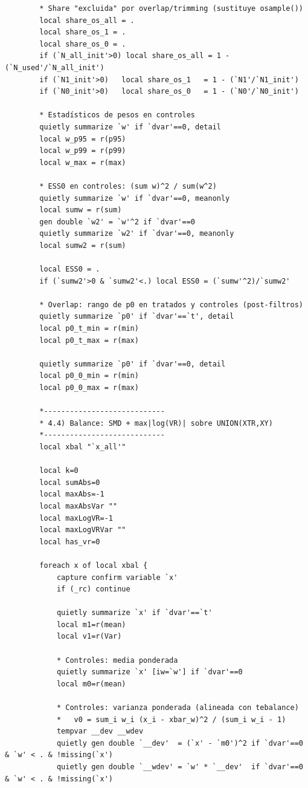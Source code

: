 \documentclass[12pt]{article}
\begin{document}
\begin{lstlisting}
        * Share "excluida" por overlap/trimming (sustituye osample())
        local share_os_all = .
        local share_os_1 = .
        local share_os_0 = .
        if (`N_all_init'>0) local share_os_all = 1 - (`N_used'/`N_all_init')
        if (`N1_init'>0)   local share_os_1   = 1 - (`N1'/`N1_init')
        if (`N0_init'>0)   local share_os_0   = 1 - (`N0'/`N0_init')

        * Estadísticos de pesos en controles
        quietly summarize `w' if `dvar'==0, detail
        local w_p95 = r(p95)
        local w_p99 = r(p99)
        local w_max = r(max)

        * ESS0 en controles: (sum w)^2 / sum(w^2)
        quietly summarize `w' if `dvar'==0, meanonly
        local sumw = r(sum)
        gen double `w2' = `w'^2 if `dvar'==0
        quietly summarize `w2' if `dvar'==0, meanonly
        local sumw2 = r(sum)

        local ESS0 = .
        if (`sumw2'>0 & `sumw2'<.) local ESS0 = (`sumw'^2)/`sumw2'

        * Overlap: rango de p0 en tratados y controles (post-filtros)
        quietly summarize `p0' if `dvar'==`t', detail
        local p0_t_min = r(min)
        local p0_t_max = r(max)

        quietly summarize `p0' if `dvar'==0, detail
        local p0_0_min = r(min)
        local p0_0_max = r(max)

        *----------------------------
        * 4.4) Balance: SMD + max|log(VR)| sobre UNION(XTR,XY)
        *----------------------------
        local xbal "`x_all'"

        local k=0
        local sumAbs=0
        local maxAbs=-1
        local maxAbsVar ""
        local maxLogVR=-1
        local maxLogVRVar ""
        local has_vr=0

        foreach x of local xbal {
            capture confirm variable `x'
            if (_rc) continue

            quietly summarize `x' if `dvar'==`t'
            local m1=r(mean)
            local v1=r(Var)

            * Controles: media ponderada
            quietly summarize `x' [iw=`w'] if `dvar'==0
            local m0=r(mean)

            * Controles: varianza ponderada (alineada con tebalance)
            *   v0 = sum_i w_i (x_i - xbar_w)^2 / (sum_i w_i - 1)
            tempvar __dev __wdev
            quietly gen double `__dev'  = (`x' - `m0')^2 if `dvar'==0 & `w' < . & !missing(`x')
            quietly gen double `__wdev' = `w' * `__dev'  if `dvar'==0 & `w' < . & !missing(`x')


\end{lstlisting}
\end{document}
